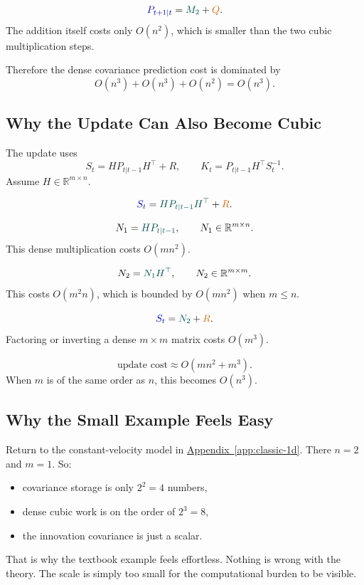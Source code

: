 \documentclass[12pt,a4paper]{article}
\begin{document}
\[
\eqfocusa{P_{t+1|t}} = \eqfocusb{M_2} + \eqfocusc{Q}.
\]
The addition itself costs only \(O(n^2)\), which is smaller than the two cubic multiplication steps.

Therefore the dense covariance prediction cost is dominated by
\[
O(n^3) + O(n^3) + O(n^2) = O(n^3).
\]

\subsection{Why the Update Can Also Become Cubic}\label{app:derivation-update}

The update uses
\[
S_t = H P_{t|t-1} H^\top + R,
\qquad
K_t = P_{t|t-1} H^\top S_t^{-1}.
\]
Assume \(H \in \mathbb{R}^{m \times n}\).

\[
\eqfocusa{S_t} = \eqfocusb{H P_{t|t-1} H^\top} + \eqfocusc{R}.
\]

\[
N_1 = \eqfocusb{H P_{t|t-1}}, \qquad N_1 \in \mathbb{R}^{m \times n}.
\]
This dense multiplication costs \(O(m n^2)\).

\[
N_2 = \eqfocusb{N_1 H^\top}, \qquad N_2 \in \mathbb{R}^{m \times m}.
\]
This costs \(O(m^2 n)\), which is bounded by \(O(m n^2)\) when \(m \le n\).

\[
\eqfocusa{S_t} = \eqfocusb{N_2} + \eqfocusc{R}.
\]
Factoring or inverting a dense \(m \times m\) matrix costs \(O(m^3)\).

\[
\text{update cost} \approx O(m n^2 + m^3).
\]
When \(m\) is of the same order as \(n\), this becomes \(O(n^3)\).

\subsection{Why the Small Example Feels Easy}\label{app:derivation-small}

Return to the constant-velocity model in \hyperref[app:classic-1d]{Appendix~\ref*{app:classic-1d}}. There \(n=2\) and \(m=1\). So:
\begin{itemize}
  \item covariance storage is only \(2^2 = 4\) numbers,
  \item dense cubic work is on the order of \(2^3 = 8\),
  \item the innovation covariance is just a scalar.
\end{itemize}

That is why the textbook example feels effortless. Nothing is wrong with the theory. The scale is simply too small for the computational burden to be visible.
\end{document}
